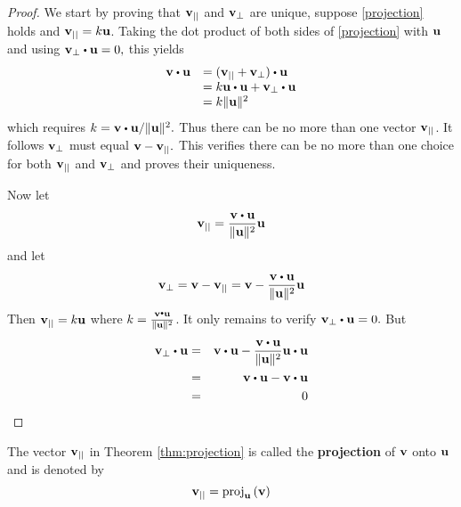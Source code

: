 \begin{proof}
We start by proving that ${\bf v}_{||}$ and ${\bf v}_{\bot}$ are unique, suppose \ref{projection} holds and ${\bf v}_{||}= k {\bf u}$.
 Taking the dot product of both sides of \ref{projection} with ${\bf u}$ and using $\vect{v}_{\bot }\dotprod \vect{u}=0,$
 this yields
\begin{equation*}
\begin{array}{ll}
\vect{v}\dotprod \vect{u} & = ( \vect{v}_{||}+\vect{v}_{\bot }) \dotprod \vect{u} \\
& =  k\vect{u} \dotprod \vect{u} + \vect{v}_{\bot} \dotprod \vect{u} \\
& = k \vectlength \vect{u}\vectlength ^{2}
\end{array}
\end{equation*}
which requires $k =\vect{v}\dotprod \vect{u} / \vectlength \vect{u}\vectlength ^{2}.$
Thus there can be no more than one vector ${\bf v}_{||}$. It follows 
${\bf v}_{\bot }$ must equal ${\bf v}-{\bf v}_{||}.$ This verifies there can
be no more than one choice for both ${\bf v}_{||}$ and ${\bf v}_{\bot
}$ and proves their uniqueness. 

Now let
\begin{equation*}
\vect{v}_{||} = 
\frac{\vect{v}\dotprod \vect{u}}{\vectlength \vect{u}\vectlength ^{2}}\vect{u}
\end{equation*}
and let
\begin{equation*}
\vect{v}_{\bot }=\vect{v}-\vect{v}_{||}=\vect{v}-\frac{\vect{v}\dotprod \vect{u}}
{\vectlength \vect{u}\vectlength ^{2}}\vect{u}
\end{equation*}
Then ${\bf v}_{||}= k{\bf u}$ where $k =\frac{\vect{v}\dotprod \vect{u}}{\vectlength \vect{u}\vectlength ^{2}}$.
 It only remains to
verify $\vect{v}_{\bot }\dotprod \vect{u}=0.$ But
\begin{eqnarray*}
\vect{v}_{\bot }\dotprod \vect{u} &=& \vect{v}\dotprod \vect{u}-\frac{\vect{v}\dotprod \vect{u}}{\vectlength \vect{u}\vectlength ^{2}}\vect{u}\dotprod \vect{u} \\
&=& \vect{v}\dotprod\vect{u}-\vect{v}\dotprod \vect{u}\\
&=& 0 
\end{eqnarray*}
\end{proof}

The vector ${\bf v}_{||}$ in Theorem \ref{thm:projection} is called the \textbf{projection}
of ${\bf v}$ onto ${\bf u}$ and is denoted by
\begin{equation*}
{\bf v}_{||}
=
\mbox{proj}_{{\bf u}}\left({\bf v}\right)
\end{equation*}

